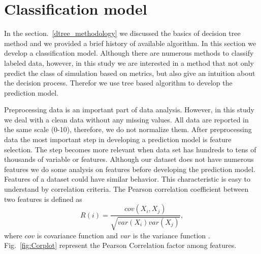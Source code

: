 \section{Classification model} \label{dtree}

In the section.~\ref{dtree_methodology} we discussed the basics of decision tree method and we provided a brief history of available algorithm. In this section we develop a classification model. Although there are numerous methods to classify labeled data, however, in this study we are interested in a method that not only predict the class of simulation based on metrics, but also give an intuition about the decision process. Therefor we use tree based algorithm to develop the prediction model.

Preprocessing data is an important part of data analysis. However, in this study we deal with a clean data without any missing values. All data are reported in the same scale (0-10), therefore, we do not normalize them. After preprocessing data the most important step in developing a prediction model is feature selection. The step becomes more relevant when data set has hundreds to tens of thousands of variable or features. Although our dataset does not have numerous features we do some analysis on features before developing the prediction model. Features of a dataset could have similar behavior. This characteristic is easy to understand by correlation criteria. The Pearson correlation coefficient between two features is defined as
% 
\begin{equation}
R(i)=\frac{cov(X_i,X_j)}{\sqrt{var(X_i)var(X_j)}},
\end{equation} 
% 
where $cov$ is covariance function and $var$ is the variance function \citep{Guyon_2003}. Fig.~\ref{fig:Corplot} represent the Pearson Correlation factor among features.  

